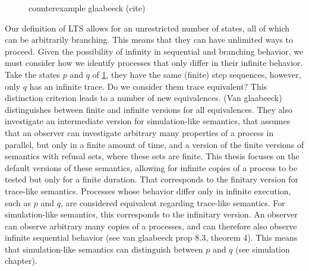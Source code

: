 \begin{isabellebody}
\begin{isamarkuptext}
\begin{figure}[htbp]
\caption{counterexample glaabeeck (cite)}
    \label{fig:2.2}
\end{figure}%
\end{isamarkuptext}\isamarkuptrue%
%
\begin{isamarkuptext}%
Our definition of LTS allows for an unrestricted number of states, all of which can be arbitrarily branching. This means that they can have unlimited ways to proceed. 
Given the possibility of infinity in sequential and branching behavior, we must consider how we identify processes that only differ in their infinite behavior. 
Take the states $p$ and $q$ of \ref{fig:2.2}, they have the same (finite) step sequences, however, only $q$ has an infinite trace. Do we consider them trace equivalent?
This distinction criterion leads to a number of new equivalences. (Van glaabeeck) distinguishes between finite and infinite versions for all equivalences.
They also investigate an intermediate version for simulation-like semantics, that assumes that an observer can investigate arbitrary many properties of a process in parallel, but only in a finite amount of time, 
and a version of the finite versions of semantics with refusal sets, where these sets are finite. This thesis focuses on the default versions of these semantics, allowing for infinite copies of a process to be tested but only for a finite duration. That corresponds to the finitary version for trace-like semantics. Processes whose behavior differ only in infinite execution, such as $p$ and $q$, are considered equivalent regarding trace-like semantics.
For simulation-like semantics, this corresponds to the infinitary version. An observer can observe arbitrary many copies of a processes, and can therefore also observe infinite sequential behavior (see van glaabeeck prop 8.3, theorem 4). This means that simulation-like semantics can distinguish between $p$ and $q$ (see simulation chapter).%
\end{isamarkuptext}\isamarkuptrue%
%
\isadelimtheory
%
\endisadelimtheory
%
\isatagtheory
%
\endisatagtheory
{\isafoldtheory}%
%
\isadelimtheory
%
\endisadelimtheory
%
\end{isabellebody}%
